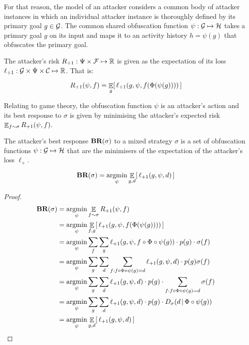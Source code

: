 For that reason, the model of an attacker considers a common body of attacker instances in which an individual attacker instance is thoroughly defined by its primary goal $g \in \mathcal{G}$. The common shared obfuscation function $\psi: \mathcal{G} \mapsto \mathcal{H}$ takes a primary goal $g$ on its input and maps it to an activity history $h = \psi(g)$ that obfuscates the primary goal.


\begin{definition}
    The attacker's risk $R_{{\text{+}1}} : \Psi \times \mathcal{F} \mapsto \mathbb{R}$ is given as the expectation of its loss $\ell_{{\text{+}1}} : \mathcal{G} \times \Psi \times \mathcal{C} \mapsto \mathbb{R}$. That is:

    \begin{equation}
        R_{{\text{+}1}}(\psi, f) = \mathop{\mathbb{E}}_g [\, \ell_{{\text{+}1}} (g, \psi, f(\Phi(\psi(g)))) \,]
    \end{equation}
\end{definition}


Relating to game theory, the obfuscation function $\psi$ is an attacker's action and its best response to $\sigma$ is given by minimising the attacker's expected risk $\mathop{\mathbb{E}}_{f \sim \sigma} R_{{\text{+}1}}(\psi, f)$.

\begin{proposition}\label{prop:br}
    The attacker's best response $\textbf{BR}(\sigma)$ to a mixed strategy $\sigma$ is a set of obfuscation functions $\psi: \mathcal{G} \mapsto \mathcal{H}$ that are the minimisers of the expectation of the attacker's loss $\ell_\plus$.

    \begin{equation}
        \textbf{BR}(\sigma) = \mathop{\text{argmin}}_\psi \mathop{\mathbb{E}}_{g,d} [\, \ell_{{\text{+}1}} (g, \psi, d) \,]
    \end{equation}
\end{proposition}

\begin{proof}
    \begin{align}
        \textbf{BR}(\sigma) &= \mathop{\text{argmin}}_\psi \mathop{\mathbb{E}}_{f \sim \sigma} R_{{\text{+}1}}(\psi, f) \\
            &= \mathop{\text{argmin}}_\psi \mathop{\mathbb{E}}_{f, g} [\, \ell_{{\text{+}1}} (g, \psi, f(\Phi(\psi(g)))) \,] \\
            &= \mathop{\text{argmin}}_\psi \sum_f \sum_g  \ell_{{\text{+}1}} (g, \psi, f \circ \Phi \circ \psi(g))  \cdot  p(g) \cdot  \sigma(f)  \\
            &= \mathop{\text{argmin}}_\psi \sum_g \sum_d \sum_{f: f \circ \Phi \circ \psi(g) = d}  \ell_{{\text{+}1}} (g, \psi, d) \cdot  p(g)\sigma(f) \\
            &= \mathop{\text{argmin}}_\psi \sum_g \sum_d \ell_{{\text{+}1}} (g, \psi, d)  \cdot   p(g)  \cdot  \sum_{f: f \circ \Phi \circ \psi(g) = d} \sigma(f) \\
            &= \mathop{\text{argmin}}_\psi \sum_g \sum_d \ell_{{\text{+}1}} (g, \psi, d) \cdot  p(g)  \cdot D_\sigma(d \,|\, \Phi \circ \psi(g) ) \\
            &= \mathop{\text{argmin}}_\psi \mathop{\mathbb{E}}_{g,d} [\, \ell_{{\text{+}1}} (g, \psi, d) \,]
    \end{align}
\end{proof}


